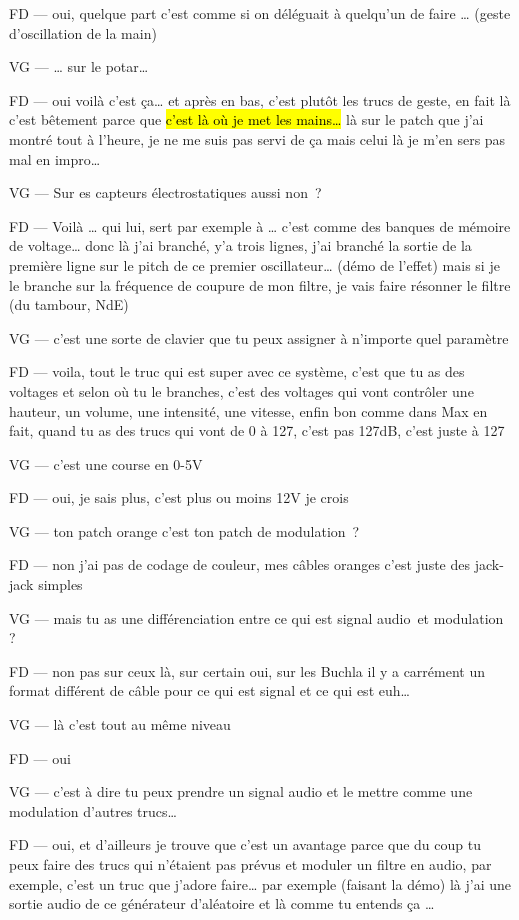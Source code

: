 FD —  oui, quelque part c'est comme si on déléguait à quelqu'un de faire … (geste d'oscillation de la main) 

VG —  … sur le potar… 

FD —  oui voilà c'est ça… et après en bas, c'est plutôt les trucs de geste, en fait là c'est bêtement parce que \hl{c'est là où je met les mains…} là sur le patch que j'ai montré tout à l'heure, je ne me suis pas servi de ça mais celui là je m'en sers pas mal en impro… 

VG —  Sur es capteurs électrostatiques aussi non ? 

FD —  Voilà … qui lui, sert par exemple à … c'est comme des banques de mémoire de voltage… donc là j'ai branché, y'a trois lignes, j'ai branché la sortie de la première ligne sur le pitch de ce premier oscillateur… (démo de l'effet) mais si je le branche sur la fréquence de coupure de mon filtre, je vais faire résonner le filtre (du tambour, NdE) 

VG —  c'est une sorte de clavier que tu peux assigner à n'importe quel paramètre 

FD —  voila, tout le truc qui est super avec ce système, c'est que tu as des voltages et selon où tu le branches, c'est des voltages qui vont contrôler une hauteur, un volume, une intensité, une vitesse, enfin bon comme dans Max en fait, quand tu as des trucs qui vont de 0 à 127, c'est pas 127dB, c'est juste à 127  

VG —  c'est une course en 0-5V 

FD —  oui, je sais plus, c'est plus ou moins 12V je crois 

VG —  ton patch orange c'est ton patch de modulation ? 

FD —  non j'ai pas de codage de couleur, mes câbles oranges c'est juste des jack-jack simples 

VG —  mais tu as une différenciation entre ce qui est signal audio et modulation ? 

FD —  non pas sur ceux là, sur certain oui, sur les Buchla il y a carrément un format différent de câble pour ce qui est signal et ce qui est euh… 

VG —  là c'est tout au même niveau 

FD —  oui 

VG —  c'est à dire tu peux prendre un signal audio et le mettre comme une modulation d'autres trucs… 

FD —  oui, et d'ailleurs je trouve que c'est un avantage parce que du coup tu peux faire des trucs qui n'étaient pas prévus et moduler un filtre en audio, par exemple, c'est un truc que j'adore faire… par exemple (faisant la démo) là j'ai une sortie audio de ce générateur d'aléatoire et là comme tu entends ça … 

